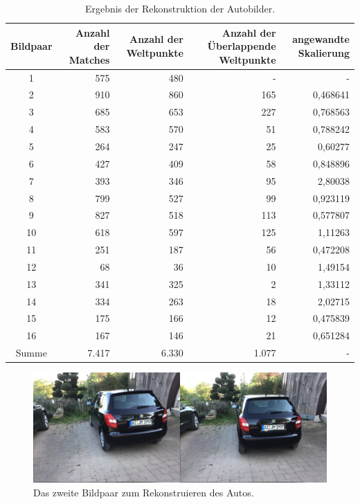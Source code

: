 \begin{table}
    \begin{tabularx}{\textwidth}{c r r r r}
        \toprule
        Bildpaar &  Anzahl der Matches & Anzahl der Weltpunkte & Anzahl der Überlappende Weltpunkte & angewandte Skalierung \\ 
        \midrule
        1  & 575 & 480 & -  & - \\
        2  & 910 & 860 & 165 & 0,468641 \\
        3  & 685 & 653 & 227 & 0,768563 \\
        4  & 583 & 570 & 51  & 0,788242 \\
        5  & 264 & 247 & 25  & 0,60277 \\
        6  & 427 & 409 & 58  & 0,848896 \\
        7  & 393 & 346 & 95  & 2,80038 \\
        8  & 799 & 527 & 99  & 0,923119 \\
        9  & 827 & 518 & 113 & 0,577807 \\
        10 & 618 & 597 & 125 & 1,11263 \\
        11 & 251 & 187 & 56  & 0,472208 \\
        12 & 68  & 36  & 10  & 1,49154 \\
        13 & 341 & 325 & 2   & 1,33112 \\
        14 & 334 & 263 & 18  & 2,02715 \\
        15 & 175 & 166 & 12  & 0,475839 \\
        16 & 167 & 146 & 21  & 0,651284 \\
        \midrule
        Summe & 7.417 & 6.330 & 1.077 & - \\
        \bottomrule
    \end{tabularx}
    \caption{Ergebnis der Rekonstruktion der Autobilder.}
    \label{tab:car-results}
\end{table}

\begin{figure}
    \includegraphics[width=\textwidth]{src/img/car_second_pair.jpg}
    \caption{Das zweite Bildpaar zum Rekonstruieren des Autos.}
    \label{fig:car-second-pair}
\end{figure}

